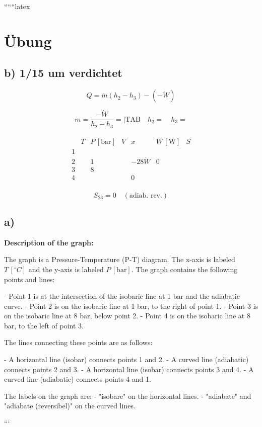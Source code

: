 
``````latex


\section*{Übung}

\subsection*{b) 1/15 um verdichtet}

\[
Q = \dot{m}(h_{2} - h_{3}) - (-\dot{W})
\]

\[
\dot{m} = \frac{-\dot{W}}{h_{2} - h_{3}} = \left| \text{TAB} \quad h_{2} = \quad h_{3} = \right.
\]

\[
\begin{array}{c|ccccc}
 & T & P \, [\text{bar}] & V & x & \dot{W} \, [\text{W}] & S \\
\hline
1 & & & & & & \\
2 & & 1 & & -28\dot{W} & 0 \\
3 & & 8 & & & & \\
4 & & & & 0 & & \\
\end{array}
\]

\[
S_{23} = 0 \quad (\text{adiab. rev.})
\]

\subsection*{a)}

\textbf{Description of the graph:}

The graph is a Pressure-Temperature (P-T) diagram. The x-axis is labeled \( T \, [^\circ C] \) and the y-axis is labeled \( P \, [\text{bar}] \). The graph contains the following points and lines:

- Point 1 is at the intersection of the isobaric line at 1 bar and the adiabatic curve.
- Point 2 is on the isobaric line at 1 bar, to the right of point 1.
- Point 3 is on the isobaric line at 8 bar, below point 2.
- Point 4 is on the isobaric line at 8 bar, to the left of point 3.

The lines connecting these points are as follows:

- A horizontal line (isobar) connects points 1 and 2.
- A curved line (adiabatic) connects points 2 and 3.
- A horizontal line (isobar) connects points 3 and 4.
- A curved line (adiabatic) connects points 4 and 1.

The labels on the graph are:
- "isobare" on the horizontal lines.
- "adiabate" and "adiabate (reversibel)" on the curved lines.

```